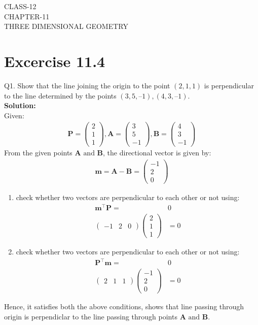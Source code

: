 \documentclass[12pt]{article}
\newcommand{\solution}{\noindent \textbf{Solution: }}
\newcommand{\myvec}[1]{\ensuremath{\begin{pmatrix}#1\end{pmatrix}}}
\let\vec\mathbf
\begin{document}
\begin{center}
\textbf\large{CLASS-12 \\ CHAPTER-11 \\ THREE DIMENSIONAL GEOMETRY}
\end{center}
\section*{Excercise 11.4}

Q1. Show that the line joining the origin to the point $(2, 1, 1)$ is perpendicular to the
line determined by the points $(3, 5, – 1), (4, 3, – 1)$.
\\
\solution
\\
Given:
\begin{align}
  \vec{P}=\myvec{2\\1\\1},\vec{A}=\myvec{3\\5\\-1},\vec{B}=\myvec{4\\3\\-1}
\end{align}
From the given points $\vec{A}\text{ and }\vec{B}$, the directional vector is given by:
		\begin{align}
	\vec{m}=\vec{A}-\vec{B}=\myvec{-1\\2\\0}
		\end{align}
		\begin{enumerate}
			\item check whether two vectors are perpendicular to each other or not using:
		\begin{align}
			\vec{m}^\top\vec{P}=&0\\
			\myvec{-1&2&0}\myvec{2\\1\\1}&=0
		\end{align}
	\item check whether two vectors are perpendicular to each other or not using:
	\begin{align}
		\vec{P}^\top\vec{m}=&0\\
			  \myvec{2&1&1}\myvec{-1\\2\\0}&=0
                  \end{align}
		\end{enumerate}
				Hence, it satisfies both the above conditions, shows that line passing through origin is perpendiclar to the line passing through points $\vec{A} \text{ and } \vec{B}$.
		
\end{document}
